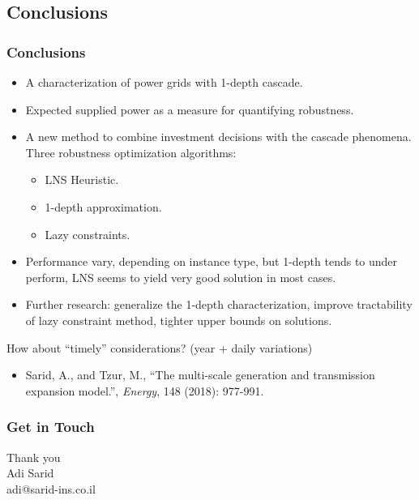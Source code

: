 \documentclass{beamer}
\begin{document}
\subsection{Conclusions}
\begin{frame}
\frametitle{Conclusions}
\begin{itemize}
	\item A characterization of power grids with 1-depth cascade.\pause
	\item Expected supplied power as a measure for quantifying robustness.\pause
	\item A new method to combine investment decisions with the cascade phenomena. Three robustness optimization algorithms:
	\begin{itemize}
		\item LNS Heuristic.
		\item 1-depth approximation.
		\item Lazy constraints.
	\end{itemize}\pause
	\item Performance vary, depending on instance type, but 1-depth tends to under perform, LNS seems to yield very good solution in most cases.\pause
	\item Further research: generalize the 1-depth characterization, improve tractability of lazy constraint method, tighter upper bounds on solutions.\pause
\end{itemize}
How about ``timely'' considerations? (year + daily variations)
\begin{itemize}
	\item Sarid, A., and Tzur, M., ``The multi-scale generation and transmission expansion model.'', \emph{Energy}, 148 (2018): 977-991.
\end{itemize}
\end{frame}

\subsubsection{Get in Touch}
\begin{frame}
\LARGE Thank you\\
\vspace{2.5cm}
\normalsize
Adi Sarid\\
adi@sarid-ins.co.il
\end{frame}
\end{document}
